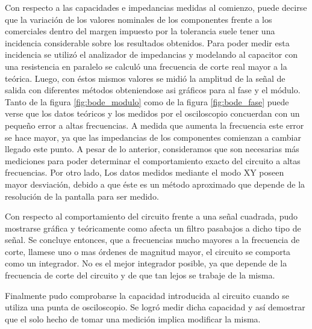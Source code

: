 Con respecto a las capacidades e impedancias medidas al comienzo, puede decirse que la variaci\'on de los valores nominales de los componentes frente a los comerciales dentro del margen impuesto por la tolerancia suele tener una incidencia considerable sobre los resultados obtenidos. Para poder medir esta incidencia se utilizó el analizador de impedancias y modelando al capacitor con una resistencia en paralelo se calculó una frecuencia de corte real mayor a la teórica. Luego, con éstos mismos valores se midió la amplitud de la señal de salida con diferentes métodos obteniendose asi gráficos para al fase y el módulo. Tanto de la figura \ref{fig:bode_modulo} como de la figura \ref{fig:bode_fase} puede verse que los datos teóricos y los medidos por el osciloscopio concuerdan con un pequeño error a altas frecuencias. A medida que aumenta la frecuencia este error se hace mayor, ya que las impedancias de los componentes comienzan a cambiar llegado este punto. A pesar de lo anterior, consideramos que son necesarias más mediciones para poder determinar el comportamiento exacto del circuito a altas frecuencias. Por otro lado, Los datos medidos mediante el modo XY poseen mayor desviación, debido a que éste es un método aproximado que depende de la resolución de la pantalla para ser medido. 


Con respecto al comportamiento del circuito frente a una señal cuadrada, pudo mostrarse gráfica y teóricamente como afecta un filtro pasabajos a dicho tipo de señal. Se concluye entonces, que a frecuencias mucho mayores a la frecuencia de corte, llamese uno o mas órdenes de magnitud mayor, el circuito se comporta como un integrador. No es el mejor integrador posible, ya que depende de la frecuencia de corte del circuito y de que tan lejos se trabaje de la misma.


Finalmente pudo comprobarse la capacidad introducida al circuito cuando se utiliza una punta de osciloscopio. Se logró medir dicha capacidad y así demostrar que el solo hecho de tomar una medición implica modificar la misma.

